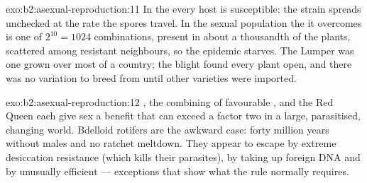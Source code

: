 \begin{solution}{exo:b2:asexual-reproduction:11}
In the  every host is susceptible: the strain spreads
unchecked at the rate the spores travel. In the sexual population
the  it overcomes is one of $2^{10} = 1024$ combinations,
present in about a thousandth of the plants, scattered among
resistant neighbours, so the epidemic starves. The Lumper was one
 grown over most of a country; the blight found every plant
open, and there was no variation to breed from until other
varieties were imported.
\end{solution}

\begin{solution}{exo:b2:asexual-reproduction:12}
, the combining of favourable , and the
Red Queen each give sex a benefit that can exceed a factor two in a
large, parasitised, changing world. Bdelloid rotifers are the
awkward case: forty million years without males and no ratchet
meltdown. They appear to escape by extreme desiccation resistance
(which kills their parasites), by taking up foreign DNA and by
unusually efficient  --- exceptions that show what the
rule normally requires.
\end{solution}

